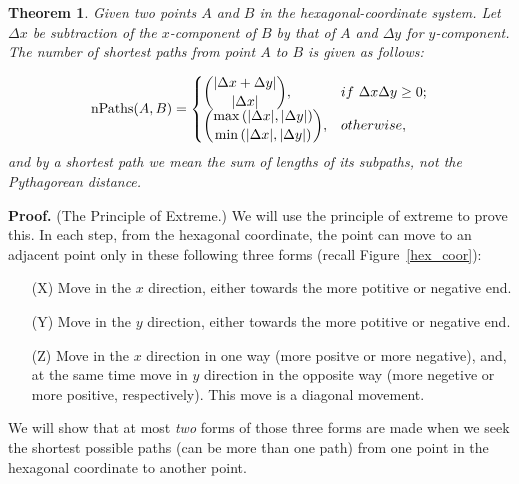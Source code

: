 \documentclass{icmmcm}
\newtheorem{Theo1}{Theorem}
\begin{document}
\begin{Theo1}
Given two points $A$ and $B$ in the hexagonal-coordinate system. Let $\Delta x$ be subtraction of the $x$-component of $B$ by that of $A$ and $\Delta y$ for $y$-component. The number of \emph{shortest} paths from point $A$ to $B$ is given as follows:

\[ \text{nPaths}(A,B) = 
\begin{cases} 
  \dbinom{|\Delta x+\Delta y|}{ |\Delta x|}, & {\emph \rm if~} \Delta x\Delta y\geq 0;\\

  \dbinom{\max{\left(|\Delta x|,|\Delta y|\right)}}{\min\left(|\Delta x|,|\Delta y|\right)}, & {\emph \rm otherwise,}\\
\end{cases}
\]
and by a shortest path we mean the sum of lengths of its subpaths, not the Pythagorean distance.

\end{Theo1}
{\bf Proof.}
(The Principle of Extreme.) We will use the principle of extreme to prove this. In each step, from the hexagonal coordinate, the point can move to an adjacent point only in these following three forms (recall Figure~\ref{hex_coor}):
\begin{enumerate}
\item[(X)] Move in the $x$ direction, either towards the more potitive or negative end.
\item[(Y)] Move in the $y$ direction, either towards the more potitive or negative end.
\item[(Z)] Move in the $x$ direction in one way (more positve or more negative), and, at the same time move in $y$ direction in the opposite way (more negetive or more positive, respectively). This move is a diagonal movement.
\end{enumerate}
We will show that at most \emph{two} forms of those three forms are made when we seek the shortest possible paths (can be more than one path) from one point in the hexagonal coordinate to another point. 
\end{document}
